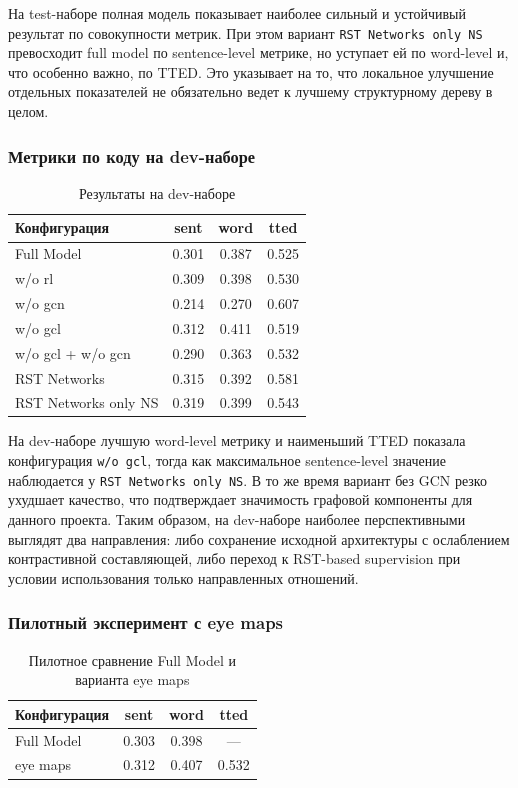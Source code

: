 \documentclass[12pt,a4paper]{article}
\begin{document}
На test-наборе полная модель показывает наиболее сильный и устойчивый результат по
совокупности метрик. При этом вариант \texttt{RST Networks only NS} превосходит full model
по sentence-level метрике, но уступает ей по word-level и, что особенно важно, по TTED.
Это указывает на то, что локальное улучшение отдельных показателей не обязательно ведет к
лучшему структурному дереву в целом.

\subsubsection{Метрики по коду на dev-наборе}

\begin{table}[H]
\centering
\caption{Результаты на dev-наборе}
\begin{tabular}{lccc}
\toprule
Конфигурация & sent & word & tted \\
\midrule
Full Model & 0.301 & 0.387 & 0.525 \\
w/o rl & 0.309 & 0.398 & 0.530 \\
w/o gcn & 0.214 & 0.270 & 0.607 \\
w/o gcl & 0.312 & 0.411 & 0.519 \\
w/o gcl + w/o gcn & 0.290 & 0.363 & 0.532 \\
RST Networks & 0.315 & 0.392 & 0.581 \\
RST Networks only NS & 0.319 & 0.399 & 0.543 \\
\bottomrule
\end{tabular}
\end{table}

На dev-наборе лучшую word-level метрику и наименьший TTED показала конфигурация
\texttt{w/o gcl}, тогда как максимальное sentence-level значение наблюдается у
\texttt{RST Networks only NS}. В то же время вариант без GCN резко ухудшает качество,
что подтверждает значимость графовой компоненты для данного проекта. Таким образом,
на dev-наборе наиболее перспективными выглядят два направления: либо сохранение
исходной архитектуры с ослаблением контрастивной составляющей, либо переход к
RST-based supervision при условии использования только направленных отношений.

\subsubsection{Пилотный эксперимент с eye maps}

\begin{table}[H]
\centering
\caption{Пилотное сравнение Full Model и варианта eye maps}
\begin{tabular}{lccc}
\toprule
Конфигурация & sent & word & tted \\
\midrule
Full Model & 0.303 & 0.398 & --- \\
eye maps & 0.312 & 0.407 & 0.532 \\
\bottomrule
\end{tabular}
\end{table}
\end{document}

